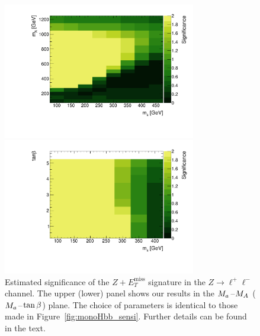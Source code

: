\documentclass[a4paper, 11pt,notoc]{article}
\newcommand{\MET}{\ensuremath{E_T^\mathrm{miss}}\xspace}
\newcommand{\mA}{\ensuremath{M_{A}}\xspace}
\newcommand{\ma}{\ensuremath{M_{a}}\xspace}
\begin{document}
\begin{figure}[t!]
\centering
\includegraphics[width=0.75\textwidth]{mAma_Significance_wsyst_ll_2HDMa.pdf} 

\vspace{2mm}

\includegraphics[width=0.75\textwidth]{tanbma_Significance_wsyst_ll_2HDMa.pdf} 
\vspace{2mm}
\caption{Estimated significance of the $Z+\MET$ signature in the $Z \to \ell^+ \ell^-$ channel. The upper (lower) panel shows our results in the $\ma\hspace{0.25mm}$--$\hspace{0.25mm}\mA$ ($\ma\hspace{0.25mm}$--$\hspace{0.25mm}\tan \beta$) plane. The choice of parameters is identical to those made in Figure~\ref{fig:monoHbb_sensi}. Further details can be found in the text. }
\label{fig:monoZll_sensi}
\end{figure}
 
\end{document}
